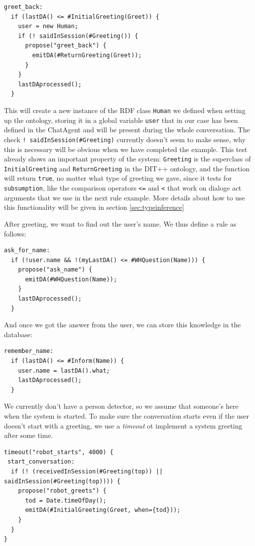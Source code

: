 \begin{lstlisting}
greet_back:
  if (lastDA() <= #InitialGreeting(Greet)) {
    user = new Human;
    if (! saidInSession(#Greeting()) {
      propose("greet_back") {
        emitDA(#ReturnGreeting(Greet));
      }
    }
    lastDAprocessed();
  }
\end{lstlisting}

This will create a new instance of the RDF class \texttt{Human} we defined when
setting up the ontology, storing it in a global variable \texttt{user} that in
our case has been defined in the ChatAgent and will be present during the whole
conversation. The check \texttt{!~saidInSession(\#Greeting)} currently doesn't
seem to make sense, why this is necessary will be obvious when we have
completed the example. This test already shows an important property of the
system: \texttt{Greeting} is the superclass of \texttt{InitialGreeting} and
\texttt{ReturnGreeting} in the DIT++ ontology, and the function will return
\texttt{true}, no matter what type of greeting we gave, since it tests for
\texttt{subsumption}, like the comparison operators \texttt{<=} and \texttt{<}
that work on dialoge act arguments that we use in the next rule example. More
details about how to use this functionality will be given in section
\ref{sec:typeinference}

After greeting, we want to find out the user's name. We thus define a rule as
follows:

\begin{lstlisting}
ask_for_name:
  if (!user.name && !(myLastDA() <= #WHQuestion(Name))) {
    propose("ask_name") {
      emitDA(#WHQuestion(Name));
    }
    lastDAprocessed();
  }
\end{lstlisting}

And once we got the answer from the user, we can store this knowledge in the
database:

\begin{lstlisting}
remember_name:
  if (lastDA() <= #Inform(Name)) {
    user.name = lastDA().what;
    lastDAprocessed();
  }
\end{lstlisting}

We currently don't have a person detector, so we assume that someone's here
when the system is started. To make sure the conversation starts even if the
user doesn't start with a greeting, we use a \emph{timeout} ot implement a
system greeting after some time.

\begin{lstlisting}
timeout("robot_starts", 4000) {
 start_conversation:
  if (! (receivedInSession(#Greeting(top)) || saidInSession(#Greeting(top)))) {
    propose("robot_greets") {
      tod = Date.timeOfDay();
      emitDA(#InitialGreeting(Greet, when={tod}));
    }
  }
}
\end{lstlisting}

